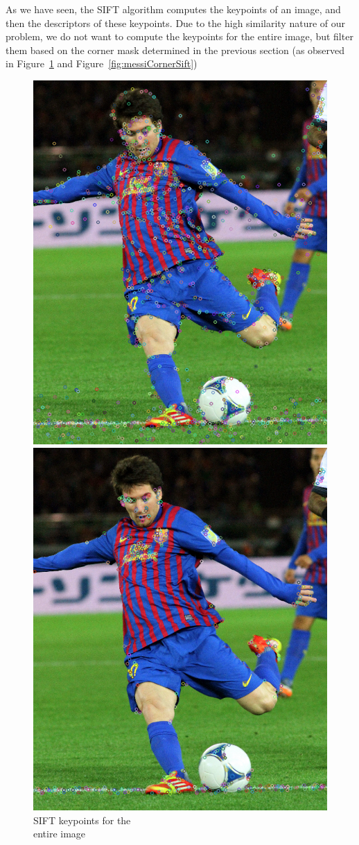 As we have seen, the SIFT algorithm computes the keypoints of an image, and then the descriptors of these keypoints. Due to the high similarity nature of our problem, we do not want to compute the keypoints for the entire image, but filter them based on the corner mask determined in the previous section (as observed in Figure~\ref{fig:messiSift} and Figure~\ref{fig:messiCornerSift})

\begin{figure}[ht!]
\centering
\begin{minipage}{.5\textwidth}
	\centering
	\includegraphics[width=.8\linewidth]{images/messiSift.png}
	\caption{SIFT keypoints for the\\ entire image}
	\label{fig:messiSift}
\end{minipage}%
\begin{minipage}{.5\textwidth}
	\centering
	\includegraphics[width=.8\linewidth]{images/messiCornerSift.png}

\end{minipage}
\end{figure}
